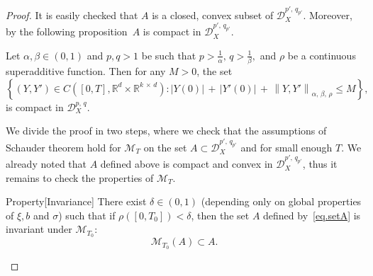 \documentclass[10pt]{amsart}
\theoremstyle{definition}\newtheorem{defi}[theo]{Definition}\newtheorem{rema}[theo]{Remark}\newtheorem{exam}[theo]{Example}\newtheorem{exem}[theo]{Example}\newtheorem{nota}[theo]{Notation}
\newcommand{\scrD}{\mathscr{D}}
\newcommand{\calM}{\mathcal{M}}
\newcommand{\Rr}{{\mathbb{R}}}
\begin{document}
\begin{proof}
It is easily checked that $A$ is a closed, convex subset of $\scrD^{p',\,q_{p'}}_{X}$. Moreover, by the following proposition~$A$ is compact in $\scrD^{p',\,q_{p'}}_{X}$.

\begin{prop}\label{prop:compactness}
Let $\alpha, \beta\in (0,1)$ and $p, q>1$ be such that $p>\frac 1 {\alpha},\, q>\frac 1 {\beta},$ and $\rho$ be a continuous superadditive function. Then for any $M>0$, the set
\[
\left\{ \left(Y, Y'\right)\in C\left([0,T], \Rr^d\times \Rr^{k\,\times\,d}\right)\colon |Y(0)|\,+\,\left|Y'(0)\right|\,+\,\left\|Y, Y'\right\|_{\alpha,\,\beta,\,\rho}\leq M
\right\},
\]
is compact in $\scrD^{p,\,q}_{X}$.
\end{prop}


We divide the proof in two steps, where we check that the assumptions of Schauder theorem hold for $\calM_{T}$ on the set $A\subset\scrD^{p',\,q_{p'}}_{X }$ and for small enough $T$. We already noted that $A$ defined above is compact and convex in $\scrD^{p',\,q_{p'}}_{X}$, thus it remains to check the properties of $\calM_{T}$.

\begin{enonce}{Property}[Invariance]
There exist $\delta\in (0, 1)$ (depending only on global properties of $\xi, b$ and $\sigma$) such that if $\rho([0,T_0])<\delta$, then the set $A$ defined by~\eqref{eq.setA} is invariant under $\calM_{T_0}$:
\[
\calM_{T_0}(A)\subset A.
\]
\end{enonce}


\end{proof}
\end{document}
